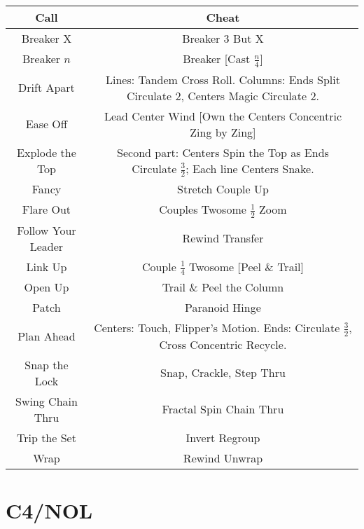 \documentclass{article}
\begin{document}
\begin{center}
  \begin{tabular}{c | c}
    Call & Cheat \\ \hline
    Breaker X & Breaker 3 But X \\
    Breaker $n$ & Breaker [Cast $\frac{n}{4}$] \\
    Drift Apart & Lines: Tandem Cross Roll.  Columns: Ends Split Circulate 2, Centers Magic Circulate 2. \\
    Ease Off & Lead Center Wind [Own the Centers Concentric Zing by Zing] \\
    Explode the Top & Second part: Centers Spin the Top as Ends Circulate $\frac32$; Each line Centers Snake. \\
    Fancy & Stretch Couple Up \\
    Flare Out & Couples Twosome $\frac12$ Zoom \\
    Follow Your Leader & Rewind Transfer \\
    Link Up & Couple $\frac14$ Twosome [Peel \& Trail] \\
    Open Up & Trail \& Peel the Column \\
    Patch & Paranoid Hinge \\
    Plan Ahead & Centers: Touch, Flipper's Motion.  Ends: Circulate $\frac32$, Cross Concentric Recycle. \\
    Snap the Lock & Snap, Crackle, Step Thru \\
    Swing Chain Thru & Fractal Spin Chain Thru \\
    Trip the Set & Invert Regroup \\
    Wrap & Rewind Unwrap \\
  \end{tabular}
\end{center}

\section*{C4/NOL}
\end{document}
